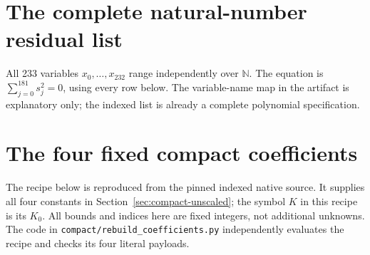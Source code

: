 \documentclass[11pt,a4paper]{article}
\theoremstyle{remark}\newtheorem{remark}[theorem]{Remark}
\newcommand{\N}{\mathbb N}
\newcommand{\code}[1]{\nolinkurl{#1}}
\begin{document}
\section{The complete natural-number residual list}
\label{app:natural}
All 233 variables \(x_0,\ldots,x_{232}\) range independently over
\(\N\). The equation is \(\sum_{j=0}^{181}s_j^2=0\), using every
row below. The variable-name map in the artifact is explanatory only;
the indexed list is already a complete polynomial specification.

\section{The four fixed compact coefficients}
\label{app:constants}
The recipe below is reproduced from the pinned indexed native source.
It supplies all four constants in Section~\ref{sec:compact-unscaled};
the symbol \(K\) in this recipe is its \(K_0\). All bounds and
indices here are fixed integers, not additional unknowns. The code in
\code{compact/rebuild_coefficients.py} independently evaluates the
recipe and checks its four literal payloads.

\end{document}
